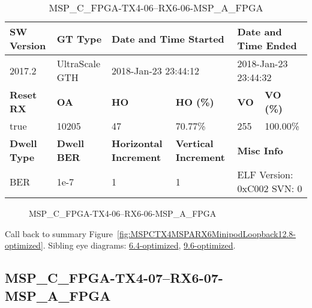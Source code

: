 \begin{table}[h]
\centering
\caption{MSP\_C\_FPGA-TX4-06--RX6-06-MSP\_A\_FPGA}
\label{tab:MSPCFPGATX406RX606MSPAFPGA12.8-optimized}
\begin{tabular}{@{}|l|l|l|l|l|l|@{}}
\toprule
\textbf{SW Version}                & \textbf{GT Type}   & \multicolumn{2}{l|}{\textbf{Date and Time Started}}            & \multicolumn{2}{l|}{\textbf{Date and Time Ended}}        \\ \midrule
2017.2                       & UltraScale GTH          & \multicolumn{2}{l|}{2018-Jan-23 23:44:12}                   & \multicolumn{2}{l|}{2018-Jan-23 23:44:32}               \\ \midrule
\textbf{Reset RX}                  & \textbf{OA} & \textbf{HO}   & \textbf{HO (\%)} & \textbf{VO} & \textbf{VO (\%)} \\ \midrule
true & 10205        & 47          & 70.77\%        & 255        & 100.00\%       \\ \midrule
\textbf{Dwell Type}                & \textbf{Dwell BER} & \textbf{Horizontal Increment} & \textbf{Vertical Increment}    & \multicolumn{2}{l|}{\textbf{Misc Info}}                  \\ \midrule
BER                            & 1e-7        & 1        & 1           & \multicolumn{2}{l|}{ELF Version: 0xC002 SVN: 0}                         \\ \bottomrule
\end{tabular}
\end{table}

\begin{figure}[h]
\caption{MSP\_C\_FPGA-TX4-06--RX6-06-MSP\_A\_FPGA} \label{fig:MSPCFPGATX406RX606MSPAFPGA12.8-optimized}
\end{figure}

Call back to summary Figure~\ref{fig:MSPCTX4MSPARX6MinipodLoopback12.8-optimized}.
Sibling eye diagrams: \hyperref[sec:MSPCFPGATX406RX606MSPAFPGA6.4-optimized]{6.4-optimized}, \hyperref[sec:MSPCFPGATX406RX606MSPAFPGA9.6-optimized]{9.6-optimized}.

\clearpage
\newpage


\subsection{MSP\_C\_FPGA-TX4-07--RX6-07-MSP\_A\_FPGA}\label{sec:MSPCFPGATX407RX607MSPAFPGA12.8-optimized}

